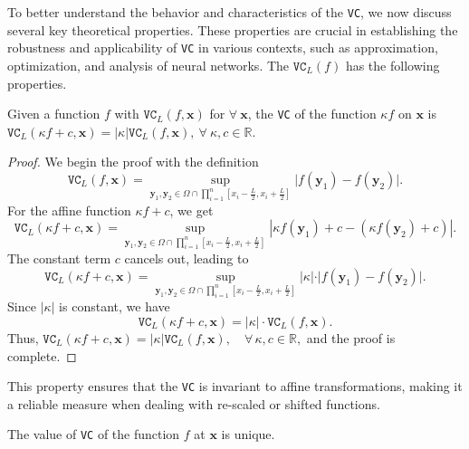 \documentclass[final]{siamart220329}
\newtheorem{theoretical insights}{Theoretical insights}
\newtheorem{practical takeaway}{Practical takeaway}
\begin{document}
{To better understand the behavior and characteristics of the \texttt{VC}, we now discuss several key theoretical properties. These properties are crucial in establishing the robustness and applicability of \texttt{VC} in various contexts, such as approximation, optimization, and analysis of neural networks. The \(\texttt{VC}_L(f) \) has the following properties. 

\begin{theorem} 
Given a function \(f\) with \( \texttt{VC}_{L}(f, {{\bm x}})\) for \(\forall\ {{\bm x}}\), the \texttt{VC} of the function \(\kappa f\) on \({{\bm x}}\) is 
\(
\texttt{VC}_{L}(\kappa f+c, {{\bm x}})=\vert \kappa\vert \texttt{VC}_{L}(f, {\bm x}),\ \forall \ \kappa, c\in\mathbb{R}.
\) 
\end{theorem}

\begin{proof}  
We begin the proof with the definition   
\[
\texttt{VC}_{L}(f, {\bm x}) = \sup_{{\bm y}_1, {\bm y}_2 \in \Omega \cap \prod_{i=1}^{n} [{x}_i-\frac{L}{2}, {x}_i+\frac{L}{2}]} \vert f({\bm y}_1) - f({\bm y}_2) \vert.   
\]  
For the affine function \(\kappa f + c\), we get  
\[
\texttt{VC}_{L}(\kappa f + c, {\bm x}) = \sup_{{\bm y}_1, {\bm y}_2 \in \Omega \cap \prod_{i=1}^{n} [{x}_i-\frac{L}{2}, {x}_i+\frac{L}{2}]} \left\vert \kappa f({\bm y}_1) + c - (\kappa f({\bm y}_2) + c) \right\vert. 
\]  
The constant term \(c\) cancels out, leading to  
\[
\texttt{VC}_{L}(\kappa f + c, {\bm x}) = \sup_{{\bm y}_1, {\bm y}_2 \in \Omega \cap \prod_{i=1}^{n} [{x}_i-\frac{L}{2}, {x}_i+\frac{L}{2}]} \vert \kappa \vert \cdot \vert f({\bm y}_1) - f({\bm y}_2) \vert.  
\]  
Since \(\vert \kappa \vert\) is constant, we have  
\[
\texttt{VC}_{L}(\kappa f + c, {\bm x}) = \vert \kappa \vert \cdot \texttt{VC}_{L}(f, {\bm x}).  
\]  
Thus,   
\(
\texttt{VC}_{L}(\kappa f + c, {\bm x}) = \vert \kappa \vert \texttt{VC}_{L}(f, {\bm x}), \quad \forall \, \kappa, c \in \mathbb{R},  
\)   
and the proof is complete. 
\end{proof}
 

This property ensures that the \texttt{VC} is invariant to affine transformations, making it a reliable measure when dealing with re-scaled or shifted functions.






\begin{theorem} The value of \texttt{VC} of the function \(f\) at \({\bm x}\) is unique. 


\end{theorem}}
\end{document}
